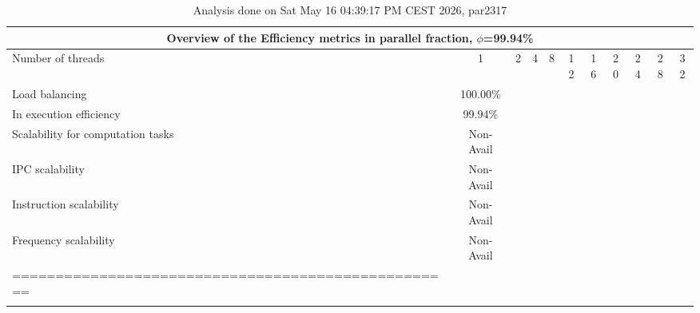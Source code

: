 \begin{table}[h]
\begin{center}
\begin{tabular}{|l|c|c|c|c|c|c|c|c|c|c|}
\hline
\multicolumn{11}{|c|}{Overview of the Efficiency metrics in parallel fraction, $\phi$=99.94\%} \\
\hline
\hline
Number of threads & 1 & 2 & 4 & 8 & 12 & 16 & 20 & 24 & 28 & 32 \\
\hline
\hline
Load balancing                   &    100.00\% \\
\hline
\hline
In execution efficiency          &     99.94\% \\
\hline
Scalability for computation tasks   &  Non-Avail \\
IPC scalability                  &  Non-Avail \\
\hline
\hline
Instruction scalability          &  Non-Avail \\
\hline
Frequency scalability            &  Non-Avail \\
=================================================== \\
 \\
\hline
\end{tabular}
\end{center}
\caption{ Analysis done on Sat May 16 04:39:17 PM CEST 2026, par2317}
\end{table}

